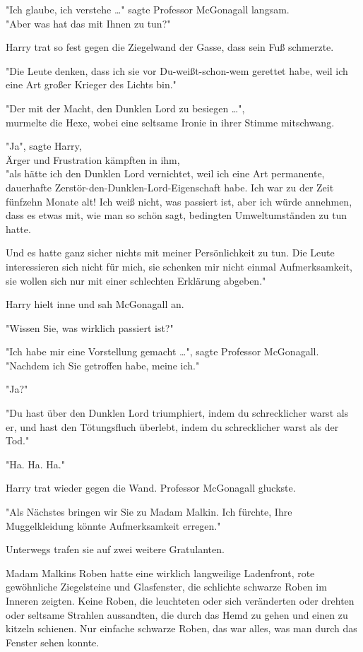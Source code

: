 {"Ich glaube, ich verstehe …" sagte Professor McGonagall langsam.\\ "Aber was hat das mit Ihnen zu tun?"

Harry trat so fest gegen die Ziegelwand der Gasse, dass sein Fuß schmerzte.

"Die Leute denken, dass ich sie vor Du-weißt-schon-wem gerettet habe, weil ich eine Art großer Krieger des Lichts bin."

"Der mit der Macht, den Dunklen Lord zu besiegen …",\\ murmelte die Hexe, wobei eine seltsame Ironie in ihrer Stimme mitschwang.

"Ja", sagte Harry,\\ Ärger und Frustration kämpften in ihm,\\ "als hätte ich den Dunklen Lord vernichtet, weil ich eine Art permanente, dauerhafte Zerstör-den-Dunklen-Lord-Eigenschaft habe. Ich war zu der Zeit fünfzehn Monate alt! Ich weiß nicht, was passiert ist, aber ich würde annehmen, dass es etwas mit, wie man so schön sagt, bedingten Umweltumständen zu tun hatte.

Und es hatte ganz sicher nichts mit meiner Persönlichkeit zu tun. Die Leute interessieren sich nicht für mich, sie schenken mir nicht einmal Aufmerksamkeit, sie wollen sich nur mit einer schlechten Erklärung abgeben."

Harry hielt inne und sah McGonagall an.

"Wissen Sie, was wirklich passiert ist?"

"Ich habe mir eine Vorstellung gemacht …", sagte Professor McGonagall. "Nachdem ich Sie getroffen habe, meine ich."

"Ja?"

"Du hast über den Dunklen Lord triumphiert, indem du schrecklicher warst als er, und hast den Tötungsfluch überlebt, indem du schrecklicher warst als der Tod."

"Ha. Ha. Ha."

Harry trat wieder gegen die Wand. Professor McGonagall gluckste.

"Als Nächstes bringen wir Sie zu Madam Malkin. Ich fürchte, Ihre Muggelkleidung könnte Aufmerksamkeit erregen."

Unterwegs trafen sie auf zwei weitere Gratulanten.

Madam Malkins Roben hatte eine wirklich langweilige Ladenfront, rote gewöhnliche Ziegelsteine und Glasfenster, die schlichte schwarze Roben im Inneren zeigten. Keine Roben, die leuchteten oder sich veränderten oder drehten oder seltsame Strahlen aussandten, die durch das Hemd zu gehen und einen zu kitzeln schienen. Nur einfache schwarze Roben, das war alles, was man durch das Fenster sehen konnte.

}
